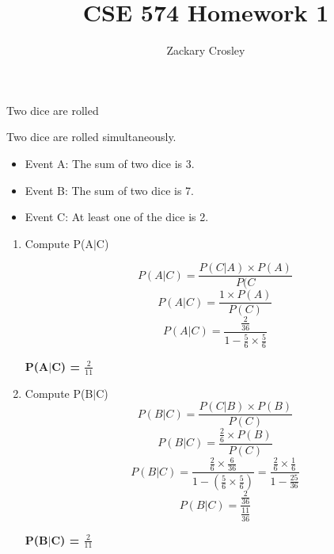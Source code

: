 \documentclass[11pt]{article}
\newenvironment{problem}[2][Problem]{\begin{trivlist}
\item[\hskip \labelsep {\bfseries #1}\hskip \labelsep {\bfseries #2.}]}{\end{trivlist}}
\begin{document}
\title{CSE 574 Homework 1}
\author{Zackary Crosley}
\maketitle

\begin{problem}{1}
	Two dice are rolled
	\item Two dice are rolled simultaneously.
	\begin{itemize}
		\item Event A: The sum of two dice is 3.
		\item Event B: The sum of two dice is 7.
		\item Event C: At least one of the dice is 2.
	\end{itemize}
	
	\begin{enumerate}
		\item Compute P(A$|$C)
		
		\begin{equation}
			P(A|C) = \frac{P(C|A) \times P(A)}{P(C}
		\end{equation}
		\begin{equation}
			P(A|C) = \frac{1 \times P(A)}{P(C)}
		\end{equation}
		\begin{equation}
			P(A|C) = \frac{\frac{2}{36}}{1-\frac{5}{6} \times \frac{5}{6}}
		\end{equation}
		\begin{center}
			\textbf{P(A$|$C) = $\frac{2}{11}$}
		\end{center}
		\item Compute P(B$|$C)
		\begin{equation}
			P(B|C) = \frac{P(C|B) \times P(B)}{P(C)}
		\end{equation}
		\begin{equation}
			P(B|C) = \frac{\frac{2}{6} \times P(B)}{P(C)}
		\end{equation}
		\begin{equation}
			P(B|C) = \frac{\frac{2}{6} \times \frac{6}{36}}{1-\left(\frac{5}{6} \times \frac{5}{6} \right)} = \frac{\frac{2}{6} \times \frac{1}{6}}{1 - \frac{25}{36}}
		\end{equation}
		\begin{equation}
			P(B|C) = \frac{\frac{2}{36}}{\frac{11}{36}}
		\end{equation}
		\begin{center}
			\textbf{P(B$|$C) = $\frac{2}{11}$}
		\end{center}
	\end{enumerate}
\end{problem}
\end{document}
